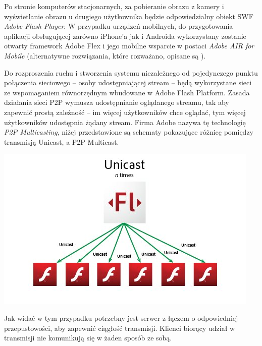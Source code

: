Po stronie komputerów stacjonarnych, za pobieranie obrazu z kamery i wyświetlanie obrazu u drugiego użytkownika będzie odpowiedzialny obiekt SWF \textit{Adobe Flash Player}. W przypadku urządzeń mobilnych, do przygotowania aplikacji obsługującej zarówno iPhone'a jak i Androida wykorzystany zostanie otwarty framework Adobe Flex i jego mobilne wsparcie w postaci \textit{Adobe AIR for Mobile} (alternatywne rozwiązania, które rozważano, opisane są ).

Do rozproszenia ruchu i stworzenia systemu niezależnego od pojedynczego punktu połączenia sieciowego -- osoby udostępniającej stream -- będą wykorzystane sieci ze wspomaganiem równorzędnym wbudowane w Adobe Flash Platform. Zasada działania sieci P2P wymusza udostępnianie oglądanego streamu, tak aby zapewnić prostą zależność -- im więcej użytkowników chce oglądać, tym więcej użytkowników udostępnia żądany stream. Firma Adobe nazywa tę technologię \textit{P2P Multicasting}, niżej przedstawione są schematy pokazujące różnicę pomiędzy transmisją Unicast, a P2P Multicast.

    \begin{center}
        \includegraphics[width=\textwidth]{img/adobe-p2p-unicast.jpg}
    \end{center}

    Jak widać w tym przypadku potrzebny jest serwer z łączem o odpowiedniej przepustowości, aby zapewnić ciągłość transmisji. Klienci biorący udział w transmisji nie komunikują się w żaden sposób ze sobą.

